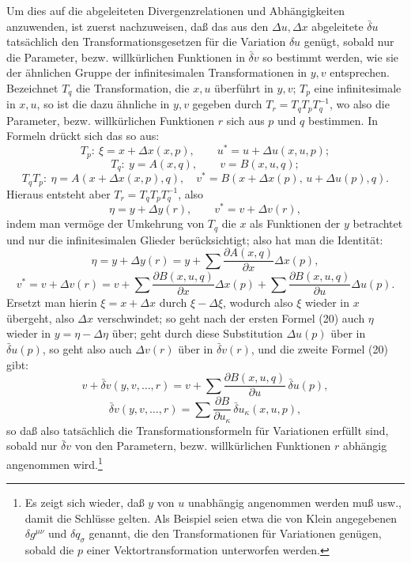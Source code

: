 \documentclass[11pt]{article}
\newcommand{\D}{\Delta}
\providecommand{\bd}{\bar{\delta}}
\providecommand{\p}{\partial}
\providecommand{\p}{\partial}
\begin{document}
Um dies auf die abgeleiteten Divergenzrelationen und Abhängigkeiten anzuwenden, ist zuerst nachzuweisen, daß das aus den \(\D u,\D x\) abgeleitete \(\bd u\) tatsächlich den Transformationsgesetzen für die Variation \(\delta u\) genügt, sobald nur die Parameter, bezw. willkürlichen Funktionen in \(\bd v\) so bestimmt werden, wie sie der ähnlichen Gruppe der infinitesimalen Transformationen in \(y,v\) entsprechen. Bezeichnet \(T_q\) die Transformation, die \(x,u\) überführt in \(y,v\); \(T_p\) eine infinitesimale in \(x,u\), so ist die dazu ähnliche in \(y,v\) gegeben durch \(T_r=T_qT_pT_q^{-1}\), wo also die Parameter, bezw. willkürlichen Funktionen \(r\) sich aus \(p\) und \(q\) bestimmen. In Formeln drückt sich das so aus:
\[
T_p:\ \xi=x+\D x(x,p),\qquad u^*=u+\D u(x,u,p);
\]
\[
T_q:\ y=A(x,q),\qquad v=B(x,u,q);
\]
\[
T_qT_p:\ \eta=A(x+\D x(x,p),q),\quad
v^*=B(x+\D x(p),\,u+\D u(p),q).
\]
Hieraus entsteht aber \(T_r=T_qT_pT_q^{-1}\), also
\[
\eta=y+\D y(r),\qquad v^*=v+\D v(r),
\]
indem man vermöge der Umkehrung von \(T_q\) die \(x\) als Funktionen der \(y\) betrachtet und nur die infinitesimalen Glieder berücksichtigt; also hat man die Identität:
\begin{equation}
\eta=y+\D y(r)=y+\sum\frac{\p A(x,q)}{\p x}\D x(p),
\tag{20a}
\end{equation}
\begin{equation}
v^*=v+\D v(r)=v+\sum\frac{\p B(x,u,q)}{\p x}\D x(p)
+\sum\frac{\p B(x,u,q)}{\p u}\D u(p).
\tag{20b}
\end{equation}
Ersetzt man hierin \(\xi=x+\D x\) durch \(\xi-\D \xi\), wodurch also \(\xi\) wieder in \(x\) übergeht, also \(\D x\) verschwindet; so geht nach der ersten Formel (20) auch \(\eta\) wieder in \(y=\eta-\D\eta\) über; geht durch diese Substitution \(\D u(p)\) über in \(\bd u(p)\), so geht also auch \(\D v(r)\) über in \(\bd v(r)\), und die zweite Formel (20) gibt:
\[
v+\bd v(y,v,\ldots,r)=v+\sum\frac{\p B(x,u,q)}{\p u}\,\bd u(p),
\]
\[
\bd v(y,v,\ldots,r)=\sum\frac{\p B}{\p u_\kappa}\,\bd u_\kappa(x,u,p),
\]
so daß also tatsächlich die Transformationsformeln für Variationen erfüllt sind, sobald nur \(\bd v\) von den Parametern, bezw. willkürlichen Funktionen \(r\) abhängig angenommen wird.\footnote{Es zeigt sich wieder, daß \(y\) von \(u\) unabhängig angenommen werden muß usw., damit die Schlüsse gelten. Als Beispiel seien etwa die von Klein angegebenen \(\delta g^{\mu\nu}\) und \(\delta q_\sigma\) genannt, die den Transformationen für Variationen genügen, sobald die \(p\) einer Vektortransformation unterworfen werden.}
\end{document}

